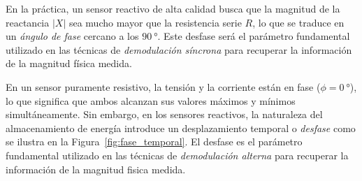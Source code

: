 \begin{marginfigure}[0em]
    \caption[Impedancias en el plano complejo para RL y RC serie.]{Representación en el plano complejo de las impedancias para circuitos RL y RC serie. La parte real representa la resistencia (disipativa) y la parte imaginaria la reactancia (almacenamiento).}\label{fig:impedancia_compleja}
\end{marginfigure}

En la práctica, un sensor reactivo de alta calidad busca que la magnitud de la reactancia $|X|$ sea mucho mayor que la resistencia serie $R$, lo que se traduce en un \emph{ángulo de fase} cercano a los $\qty{90}{\degree}$. Este desfase será el parámetro fundamental utilizado en las técnicas de \emph{demodulación síncrona} para recuperar la información de la magnitud física medida.

En un sensor puramente resistivo, la tensión y la corriente están en fase ($\phi = \qty{0}{\degree}$), lo que significa que ambos alcanzan sus valores máximos y mínimos simultáneamente. Sin embargo, en los sensores reactivos, la naturaleza del almacenamiento de energía introduce un desplazamiento temporal o \emph{desfase} como se ilustra en la Figura~\ref{fig:fase_temporal}. El desfase es el parámetro fundamental utilizado en las técnicas de \emph{demodulación alterna} para recuperar la información de la magnitud fisica medida.

